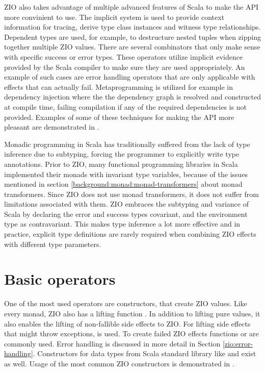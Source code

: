 ZIO also takes advantage of multiple advanced features of Scala to make the API more convinient to use. The implicit system is used to provide context information for tracing, derive type class instances and witness type relationships. Dependent types are used, for example, to destructure nested tuples when zipping together multiple ZIO values. There are several combinators that only make sense with specific success or error types. These operators utilize implicit evidence provided by the Scala compiler to make sure they are used appropriately. An example of such cases are error handling operators that are only applicable with effects that can actually fail. Metaprogramming is utilized for example in dependency injection where the the dependency graph is resolved and constructed at compile time, failing compilation if any of the required dependencies is not provided. Examples of some of these techniques for making the API more pleasant are demonstrated in .



Monadic programming in Scala has traditionally suffered from the lack of type inference due to subtyping, forcing the programmer to explicitly write type annotations. Prior to ZIO, many functional programming libraries in Scala implemented their monads with invariant type variables, because of the issues mentioned in section \ref{background:monad:monad-transformers} about monad transformers. Since ZIO does not use monad transformers, it does not suffer from limitations associated with them. ZIO embraces the subtyping and variance of Scala by declaring the error and success types covariant, and the environment type as contravariant. This makes type inference a lot more effective and in practice, explicit type definitions are rarely required when combining ZIO effects with different type parameters.



\section{Basic operators}
One of the most used operators are constructors, that create ZIO values. Like every monad, ZIO also has a lifting function . In addition to lifting pure values, it also enables the lifting of non-fallible side effects to ZIO.  For lifting side effects that might throw exceptions,  is used. To create failed ZIO effects functions  or  are commonly used. Error handling is discussed in more detail in Section \ref{zio:error-handling}. Constructors for data types from Scala standard library like  and  exist as well. Usage of the most common ZIO constructors is demonstrated in .

